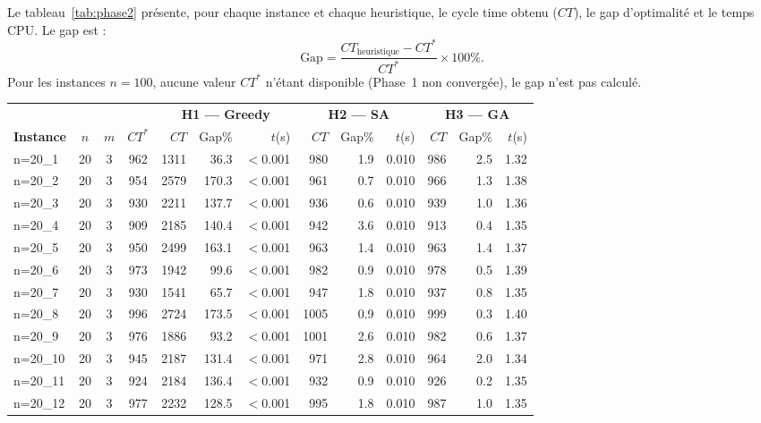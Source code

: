 \documentclass{article}
\begin{document}
Le tableau~\ref{tab:phase2} présente, pour chaque instance et chaque heuristique,
le cycle time obtenu ($CT$), le gap d'optimalité et le temps CPU. Le gap est :
\[
  \text{Gap} = \frac{CT_{\text{heuristique}} - CT^*}{CT^*} \times 100\%.
\]
Pour les instances $n=100$, aucune valeur $CT^*$ n'étant disponible (Phase~1
non convergée), le gap n'est pas calculé.

\begin{table}[h!]
\centering
\scriptsize
\setlength{\tabcolsep}{4pt}
\begin{tabular}{l c c c | r r r | r r r | r r r}
\toprule
& & & &
\multicolumn{3}{c|}{\textbf{H1 --- Greedy}} &
\multicolumn{3}{c|}{\textbf{H2 --- SA}} &
\multicolumn{3}{c}{\textbf{H3 --- GA}} \\
\textbf{Instance} & $n$ & $m$ & $CT^*$ &
$CT$ & Gap\% & $t$(s) & $CT$ & Gap\% & $t$(s) & $CT$ & Gap\% & $t$(s) \\
\midrule
n=20\_1  & 20 &  3 &  962 & 1311 &  36.3 & $<$0.001 &  980 &  1.9 & 0.010 &  986 &  2.5 & 1.32 \\
n=20\_2  & 20 &  3 &  954 & 2579 & 170.3 & $<$0.001 &  961 &  0.7 & 0.010 &  966 &  1.3 & 1.38 \\
n=20\_3  & 20 &  3 &  930 & 2211 & 137.7 & $<$0.001 &  936 &  0.6 & 0.010 &  939 &  1.0 & 1.36 \\
n=20\_4  & 20 &  3 &  909 & 2185 & 140.4 & $<$0.001 &  942 &  3.6 & 0.010 &  913 &  0.4 & 1.35 \\
n=20\_5  & 20 &  3 &  950 & 2499 & 163.1 & $<$0.001 &  963 &  1.4 & 0.010 &  963 &  1.4 & 1.37 \\
n=20\_6  & 20 &  3 &  973 & 1942 &  99.6 & $<$0.001 &  982 &  0.9 & 0.010 &  978 &  0.5 & 1.39 \\
n=20\_7  & 20 &  3 &  930 & 1541 &  65.7 & $<$0.001 &  947 &  1.8 & 0.010 &  937 &  0.8 & 1.35 \\
n=20\_8  & 20 &  3 &  996 & 2724 & 173.5 & $<$0.001 & 1005 &  0.9 & 0.010 &  999 &  0.3 & 1.40 \\
n=20\_9  & 20 &  3 &  976 & 1886 &  93.2 & $<$0.001 & 1001 &  2.6 & 0.010 &  982 &  0.6 & 1.37 \\
n=20\_10 & 20 &  3 &  945 & 2187 & 131.4 & $<$0.001 &  971 &  2.8 & 0.010 &  964 &  2.0 & 1.34 \\
n=20\_11 & 20 &  3 &  924 & 2184 & 136.4 & $<$0.001 &  932 &  0.9 & 0.010 &  926 &  0.2 & 1.35 \\
n=20\_12 & 20 &  3 &  977 & 2232 & 128.5 & $<$0.001 &  995 &  1.8 & 0.010 &  987 &  1.0 & 1.35 \\

\end{tabular}
\end{table}
\end{document}
